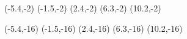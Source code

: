 \documentclass{report}
\begin{document}
 (-5.4,-2){\Label}                             %
 (-1.5,-2){\Label}
 (2.4,-2){\Label}
 (6.3,-2){\Label}
 (10.2,-2){\Label}

 (-5.4,-16){\Label}
 (-1.5,-16){\Label}
 (2.4,-16){\Label}
 (6.3,-16){\Label}
 (10.2,-16){\Label}


                                
\end{document}
